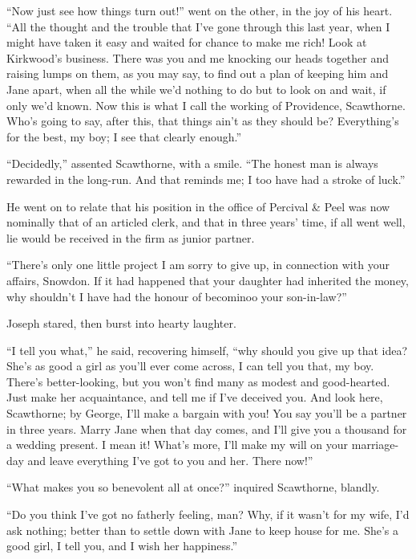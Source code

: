 ``Now just see how things turn out!'' went on the other, in the joy of
his heart. ``All the thought and the trouble that I've gone through this
last year, when I might have taken it easy and waited for chance to make
me rich! Look at Kirkwood's business. There was you and me knocking our
heads together and raising lumps on them, as you may say, to find out a
plan of keeping him and Jane apart, when all the while we'd nothing to
do but to look on and wait, if only we'd known. Now this is what I call
the working of Providence, Scawthorne. Who's going to say, after this,
that things ain't as they should be? Everything's for the best, my boy;
I see that clearly enough.''

``Decidedly,'' assented Scawthorne, with a smile. ``The honest man is
always rewarded in the long-run. And that reminds me; I too have had a
stroke of luck.''

He went on to relate that his position in the office of Percival \& Peel
was now nominally that of an articled clerk, and that in three
{\protect\hypertarget{177}{}{}}years' time, if all went well, lie would
be received in the firm as junior partner.

``There's only one little project I am sorry to give up, in connection
with your affairs, Snowdon. If it had happened that your daughter had
inherited the money, why shouldn't I have had the honour of becominoo
your son-in-law?''

Joseph stared, then burst into hearty laughter.

``I tell you what,'' he said, recovering himself, ``why should you give
up that idea? She's as good a girl as you'll ever come across, I can
tell you that, my boy. There's better-looking, but you won't find many
as modest and good-hearted. Just make her acquaintance, and tell me if
I've deceived you. And look here, Scawthorne; by George, I'll make a
bargain with you! You say you'll be a partner in three years. Marry Jane
when that day comes, and I'll give you a thousand for a wedding present.
I mean it! What's more, I'll make my will on your marriage- day and
leave everything I've got to you and her. There now!''

``What makes you so benevolent all at once?'' inquired Scawthorne,
blandly.

{\protect\hypertarget{178}{}{}}``Do you think I've got no fatherly
feeling, man? Why, if it wasn't for my wife, I'd ask nothing; better
than to settle down with Jane to keep house for me. She's a good girl, I
tell you, and I wish her happiness.''

